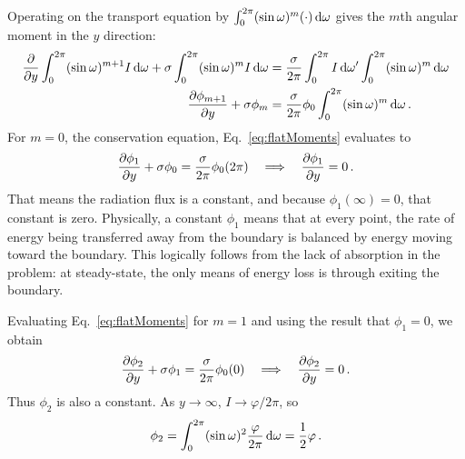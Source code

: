Operating on the transport equation by $\int_{0}^{2\pi} (\sin\omega)^m (\cdot)
\mathop{}\!\mathrm{d}\omega$ gives the $m$th angular moment in the $y$ direction:
\begin{align} \nonumber
  \frac{\partial }{\partial y} \int_{0}^{2\pi} (\sin\omega)^{m+1} I \mathop{}\!\mathrm{d}\omega
  + \sigma \int_{0}^{2\pi} (\sin\omega)^{m} I \mathop{}\!\mathrm{d}\omega
  &= \frac{\sigma}{2\pi} \int_{0}^{2\pi} I \mathop{}\!\mathrm{d} \omega'
  \int_{0}^{2\pi} (\sin\omega)^{m} \mathop{}\!\mathrm{d}\omega
  \\ \label{eq:flatMoments}
  \frac{\partial \phi_{m+1}}{\partial y}
  + \sigma \phi_{m}
  &= \frac{\sigma}{2\pi} \phi_{0}
  \int_{0}^{2\pi} (\sin\omega)^{m} \mathop{}\!\mathrm{d}\omega\,.
\end{align}
For $m=0$, the conservation equation, Eq.~\eqref{eq:flatMoments} evaluates to
\begin{equation*}
  \frac{\partial \phi_{1}}{\partial y}
  + \sigma \phi_{0}
  = \frac{\sigma}{2\pi} \phi_{0} (2\pi)
  \quad \Longrightarrow \quad
  \frac{\partial \phi_{1}}{\partial y} = 0\,.
\end{equation*}
That means the radiation flux is a constant, and because $\phi_1(\infty)=0$,
that constant is zero. Physically, a constant $\phi_1$ means that at every
point, the rate of energy being transferred away from the boundary is balanced
by energy moving toward the boundary. This logically follows from the lack of
absorption in the problem: at steady-state, the only means of energy loss is
through exiting the boundary.

Evaluating Eq.~\eqref{eq:flatMoments} for $m=1$ and using the result that
$\phi_{1}=0$, we obtain
\begin{equation*}
  \frac{\partial \phi_{2}}{\partial y}
  + \sigma \phi_{1}
  = \frac{\sigma}{2\pi} \phi_{0} (0)
  \quad \Longrightarrow \quad
  \frac{\partial \phi_{2}}{\partial y} = 0\,.
\end{equation*}
Thus $\phi_{2}$ is also a constant. As $y\to\infty$, $I\to\varphi/2\pi$, so
\begin{equation*}
  \phi_{2} = \int_{0}^{2\pi} (\sin\omega)^2 \frac{\varphi}{2\pi} \mathop{}\!\mathrm{d}\omega
  = \frac{1}{2} \varphi\,.
\end{equation*}

